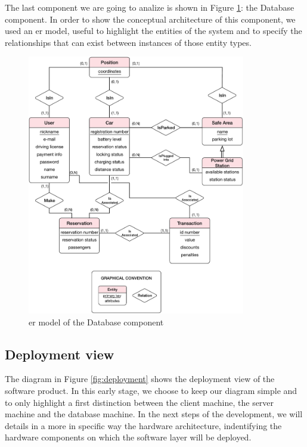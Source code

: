 \newline
The last component we are going to analize is shown in Figure \ref{fig:database}: the Database component. In order to show the conceptual architecture of this component, we used an \acl{er} model, useful to highlight the entities of the system and to specify the relationships that can exist between instances of those entity types.

\begin{figure}[htbp]
\centering
\vspace{24pt}
\includegraphics[width=0.85\textwidth]{Images/DatabaseComponent.pdf}
\vspace{10pt}
\caption{\acs{er} model of the Database component}
\label{fig:database}
\end{figure}
\clearpage

\subsection{Deployment view} \label{subsec:depl-view}

The diagram in Figure \ref{fig:deployment} shows the deployment view of the software product. In this early stage, we choose to keep our diagram simple and to only highlight a first distinction between the client machine, the server machine and the database machine.
In the next steps of the development, we will details in a more in specific way the hardware architecture, indentifying the hardware components on which the software layer will be deployed.

